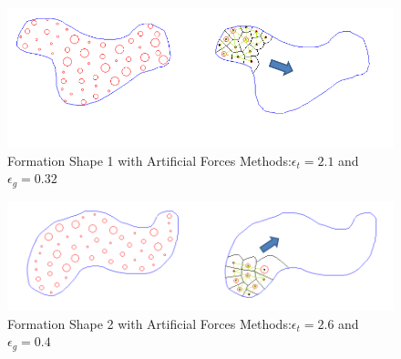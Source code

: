 		\begin{figure}[H]
			\caption{Formation Shape 1 with Artificial Forces Methods:$\epsilon_t = 2.1$ and $\epsilon_g = 0.32$}
			\centerline{\includegraphics[scale = 0.70]{Artificial_Forces_Mesh_1}}
		\end{figure} 		
				\begin{figure}[H]
					\caption{Formation Shape 2 with Artificial Forces Methods:$\epsilon_t = 2.6$ and $\epsilon_g = 0.4$}
					\centerline{\includegraphics[scale = 0.65]{Artificial_Forces_Mesh_2}}
				\end{figure} 		
		
